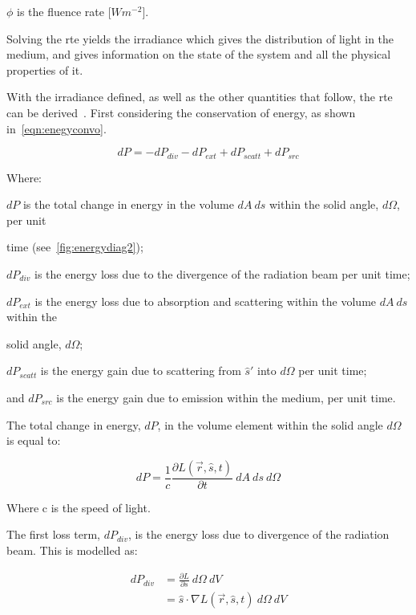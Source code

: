 \indent $\phi$ is the fluence rate [$W m^{-2}$].

\medskip

Solving the \gls*{rte} yields the irradiance which gives the distribution of light in the medium, and gives information on the state of the system and all the physical properties of it.

With the irradiance defined, as well as the other quantities that follow, the \gls*{rte} can be derived~\cite{chandrasekhar2013radiative,wang2012biomedical}. First considering the conservation of energy, as shown in~\cref{eqn:enegyconvo}.

\begin{equation}
	dP = -dP_{div} - dP_{ext} + dP_{scatt} + dP_{src}
	\label{eqn:enegyconvo}
\end{equation}

\noindent Where:

\indent $dP$ is the total change in energy in the volume $dA\ ds$ within the solid angle, $d\Omega$, per unit 

\indent time (see~\cref{fig:energydiag2});

\indent $dP_{div}$ is the energy loss due to the divergence of the radiation beam per unit time;

\indent $dP_{ext}$ is the energy loss due to absorption and scattering within the volume $dA\ ds$ within the

\indent  solid angle, $d\Omega$;

\indent $dP_{scatt}$ is the energy gain due to scattering from $\hat{s}'$ into $d\Omega$ per unit time;

\indent and $dP_{src}$ is the energy gain due to emission within the medium, per unit time.

\medskip

The total change in energy, $dP$, in the volume element within the solid angle $d\Omega$ is equal to:

\begin{equation}
	dP=\frac{1}{c}\frac{\partial L(\vec{r},\hat{s},t)}{\partial t}\ dA\ ds\ d\Omega
	\label{eqn:p}
\end{equation}

\noindent Where c is the speed of light.

\medskip

The first loss term, $dP_{div}$, is the energy loss due to divergence of the radiation beam. This is modelled as:

\begin{align}
	dP_{div}&=\frac{\partial L}{\partial s}\ d\Omega\ dV \\
		    &=\hat{s} \cdot \nabla L(\vec{r},\hat{s},t)\ d\Omega\ dV
    \label{eqn:pdiv}
\end{align}

